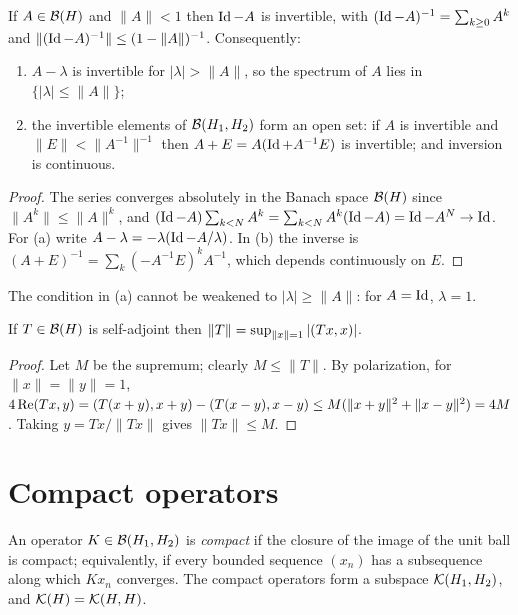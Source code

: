 \begin{proposition}\label{hilbert:prop:neumann}
If $A\in\mathcal{B}(H)$ and $\|A\|<1$ then $\operatorname{Id}-A$ is invertible, with
$(\operatorname{Id}-A)^{-1}=\sum_{k\ge0}A^k$ and $\|(\operatorname{Id}-A)^{-1}\|\le(1-\|A\|)^{-1}$. Consequently:
\begin{enumerate}[label=\textup{(\alph*)}]
\item $A-\lambda$ is invertible for $|\lambda|>\|A\|$, so the spectrum of $A$ lies in
$\{|\lambda|\le\|A\|\}$;
\item the invertible elements of $\mathcal{B}(H_1,H_2)$ form an open set: if $A$ is invertible and
$\|E\|<\|A^{-1}\|^{-1}$ then $A+E=A(\operatorname{Id}+A^{-1}E)$ is invertible; and inversion is continuous.
\end{enumerate}
\end{proposition}
\begin{proof}
The series converges absolutely in the Banach space $\mathcal{B}(H)$ since $\|A^k\|\le\|A\|^k$, and
$(\operatorname{Id}-A)\sum_{k<N}A^k=\sum_{k<N}A^k(\operatorname{Id}-A)=\operatorname{Id}-A^N\to\operatorname{Id}$. For (a) write
$A-\lambda=-\lambda(\operatorname{Id}-A/\lambda)$. In (b) the inverse is
$(A+E)^{-1}=\sum_k(-A^{-1}E)^kA^{-1}$, which depends continuously on $E$.
\end{proof}

The condition in (a) cannot be weakened to $|\lambda|\ge\|A\|$: for $A=\operatorname{Id}$, $\lambda=1$.

\begin{lemma}\label{hilbert:lem:selfadjoint-norm}
If $T\in\mathcal{B}(H)$ is self-adjoint then $\|T\|=\sup_{\|x\|=1}|( Tx, x)|$.
\end{lemma}
\begin{proof}
Let $M$ be the supremum; clearly $M\le\|T\|$. By polarization, for $\|x\|=\|y\|=1$,
$4\operatorname{Re}( Tx, y)=( T(x+y), x+y)-( T(x-y), x-y)\le M(\|x+y\|^2+\|x-y\|^2)=4M$.
Taking $y=Tx/\|Tx\|$ gives $\|Tx\|\le M$.
\end{proof}

\section{Compact operators}\label{hilbert:sec:compact}

\begin{definition}\label{hilbert:def:compact}
An operator $K\in\mathcal{B}(H_1,H_2)$ is \emph{compact} if the closure of the image of the
unit ball is compact; equivalently, if every bounded sequence $(x_n)$ has a
subsequence along which $Kx_n$ converges. The compact operators form a subspace
$\mathcal{K}(H_1,H_2)$, and $\mathcal{K}(H)=\mathcal{K}(H,H)$.
\end{definition}

